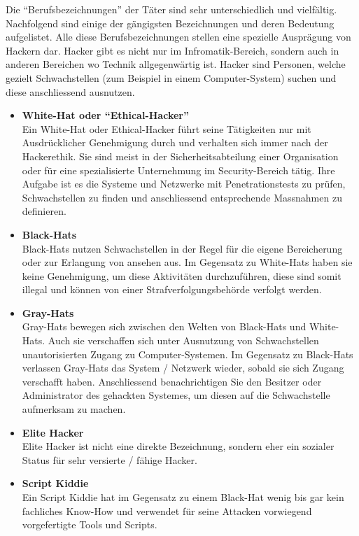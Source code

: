 Die "`Berufsbezeichnungen"' der Täter sind sehr unterschiedlich und vielfältig. Nachfolgend sind einige der gängigsten Bezeichnungen und deren Bedeutung aufgelistet. Alle diese Berufsbezeichnungen stellen eine spezielle Ausprägung von Hackern dar. Hacker gibt es nicht nur im Infromatik-Bereich, sondern auch in anderen Bereichen wo Technik allgegenwärtig ist. Hacker sind Personen, welche gezielt Schwachstellen (zum Beispiel in einem Computer-System) suchen und diese anschliessend ausnutzen. 

\begin{itemize}
\item \textbf{White-Hat oder "`Ethical-Hacker"' }\\
Ein White-Hat oder Ethical-Hacker führt seine Tätigkeiten nur mit Ausdrücklicher Genehmigung durch und verhalten sich immer nach der Hackerethik. Sie sind meist in der Sicherheitsabteilung einer Organisation oder für eine spezialisierte Unternehmung im Security-Bereich tätig. Ihre Aufgabe ist es die Systeme und Netzwerke mit Penetrationstests zu prüfen, Schwachstellen zu finden und anschliessend entsprechende Massnahmen zu definieren.

\item \textbf{Black-Hats} \\
Black-Hats nutzen Schwachstellen in der Regel für die eigene Bereicherung oder zur Erlangung von ansehen aus. Im Gegensatz zu White-Hats haben sie keine Genehmigung, um diese Aktivitäten durchzuführen, diese sind somit illegal und können von einer Strafverfolgungsbehörde verfolgt werden.

\item \textbf{Gray-Hats} \\
Gray-Hats bewegen sich zwischen den Welten von Black-Hats und White-Hats. Auch sie verschaffen sich unter Ausnutzung von Schwachstellen unautorisierten Zugang zu Computer-Systemen. Im Gegensatz zu Black-Hats verlassen Gray-Hats das System / Netzwerk wieder, sobald sie sich Zugang verschafft haben. Anschliessend benachrichtigen Sie den Besitzer oder Administrator des gehackten Systemes, um diesen auf die Schwachstelle aufmerksam zu machen.

\item \textbf{Elite Hacker} \\
Elite Hacker ist nicht eine direkte Bezeichnung, sondern eher ein sozialer Status für sehr versierte / fähige Hacker.

\item \textbf{Script Kiddie} \\
Ein Script Kiddie hat im Gegensatz zu einem Black-Hat wenig bis gar kein fachliches Know-How und verwendet für seine Attacken vorwiegend vorgefertigte Tools und Scripts.
\end{itemize}


